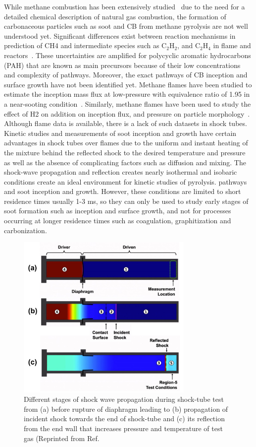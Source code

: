 While methane combustion has been extensively studied~\citep{wang2013pah} due to the need for a detailed chemical description of natural gas combustion, the formation of carbonaceous particles such as soot and CB from methane pyrolysis are not well understood yet. Significant differences exist between reaction mechanisms in prediction of CH4 and intermediate species such as $\mathrm{C_2H_2}$, and $\mathrm{C_2H_4}$ in flame and reactors~\citep{wang2013pah}. These uncertainties are amplified for polycyclic aromatic hydrocarbons (PAH) that are known as main precursors because of their low concentrations and complexity of pathways. Moreover, the exact pathways of CB inception and surface growth have not been identified yet. 
Methane flames have been studied to estimate the inception mass flux at low-pressure with equivalence ratio of 1.95 in a near-sooting condition~\citep{desgroux2017comparative}. Similarly, methane flames have been used to study the effect of H2 on addition on inception flux, and pressure on particle morphology~\citep{amin2020morphology}. Although flame data is available, there is a lack of such datasets in shock tubes. Kinetic studies and measurements of soot inception and growth have certain advantages in shock tubes over flames due to the uniform and instant heating of the mixture behind the reflected shock to the desired temperature and pressure as well as the absence of complicating factors such as diffusion and mixing. The shock-wave propagation and reflection creates nearly isothermal and isobaric conditions create an ideal environment for kinetic studies of pyrolysis. pathways and soot inception and growth. However, these conditions are limited to short residence times usually 1-3 ms, so they can only be used to study early stages of soot formation such as inception and surface growth, and not for processes occurring at longer residence times such as coagulation, graphitization and carbonization.

\begin{figure}[!htbp]
	\centering
	\includegraphics[height=80mm, ]{Figures/Results/Shocktube/shockwavestages.jpg}
	\caption{Different stages of shock wave propagation during shock-tube test from (a) before rupture of diaphragm leading to (b) propagation of incident shock towards the end of shock-tube and (c) its reflection from the end wall that increases pressure and temperature of test gas (Reprinted from Ref.~\citep{HansonGroupShockTube}}
	\label{fig:shockwave}
\end{figure}

